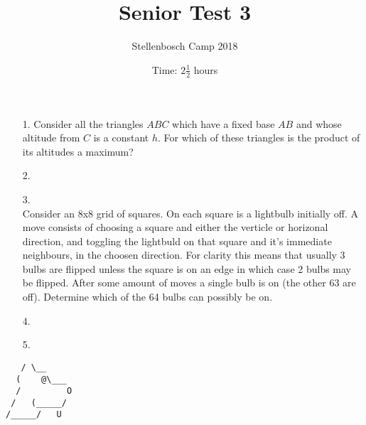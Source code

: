 \documentclass[a4paper, 12pt]{article}
\title{Senior Test 3}
\author{Stellenbosch Camp 2018}
\date{Time: $2 \frac{1}{2}$ hours}
\begin{document}
 \maketitle

\begin{enumerate}

\item[1.] Consider all the triangles $ABC$ which have a fixed base $AB$ and whose altitude from $C$ is a constant $h$. For which of these triangles is the product of its altitudes a maximum? 

% 
\item[2.]  
\\


% 
\item[3.]  \\ Consider an 8x8 grid of squares. On each square is a lightbulb initially off. A move consists of choosing a square and either the verticle or horizonal direction, and toggling the lightbuld on that square and it's immediate neighbours, in the choosen direction. For clarity this means that usually 3 bulbs are flipped unless the square is on an edge in which case 2 bulbs may be flipped. After some amount of moves a single bulb is on (the other 63 are off). Determine which of the 64 bulbs can possibly be on. 



% 
\item[4.]   \\

% 
\item[5.]   \\


\end{enumerate}

\vfill

\centering
\begin{BVerbatim}
   / \__
  (    @\___
  /         O
 /   (_____/
/_____/   U
\end{BVerbatim}

\vspace{12mm}
\end{document}
